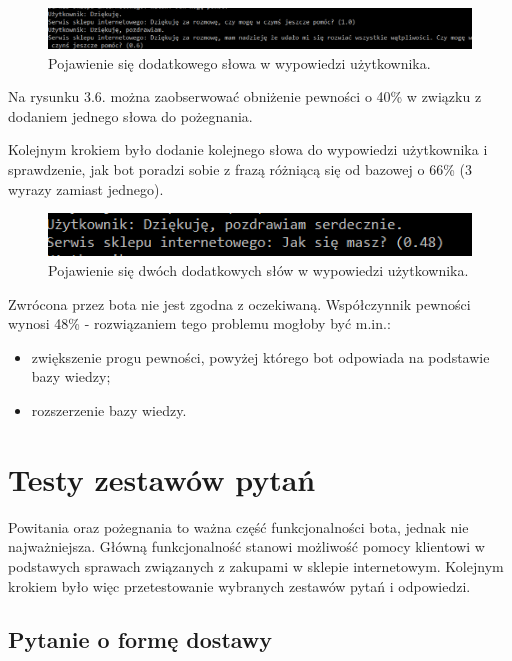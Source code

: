 \newpage

\begin{figure}[ht]
	{\centering
		\includegraphics[width=0.9\linewidth]{rys/rys03/5}
	\caption{Pojawienie się dodatkowego słowa w wypowiedzi użytkownika.}
	}
	\label{fig:bot4}
\end{figure}

Na rysunku 3.6. można zaobserwować obniżenie pewności o 40\% w związku z dodaniem jednego słowa do pożegnania.

Kolejnym krokiem było dodanie kolejnego słowa do wypowiedzi użytkownika i sprawdzenie, jak bot poradzi sobie z frazą różniącą się od bazowej o 66\% (3 wyrazy zamiast jednego).

\begin{figure}[ht]
	{\centering
		\includegraphics[width=0.9\linewidth]{rys/rys03/7}
	\caption{Pojawienie się dwóch dodatkowych słów w wypowiedzi użytkownika.}
	}
	\label{fig:bot4}
\end{figure}

Zwrócona przez bota nie jest zgodna z oczekiwaną. Współczynnik pewności wynosi 48\% - rozwiązaniem tego problemu mogłoby być m.in.:
\begin{itemize}
	\item
	zwiększenie progu pewności, powyżej którego bot odpowiada na podstawie bazy wiedzy;
	\item
	rozszerzenie bazy wiedzy.
\end{itemize}

\section{Testy zestawów pytań}

Powitania oraz pożegnania to ważna część funkcjonalności bota, jednak nie najważniejsza. Główną funkcjonalność stanowi możliwość pomocy klientowi w podstawych sprawach związanych z zakupami w sklepie internetowym. Kolejnym krokiem było więc przetestowanie wybranych zestawów pytań i odpowiedzi.

\subsection{Pytanie o formę dostawy}

